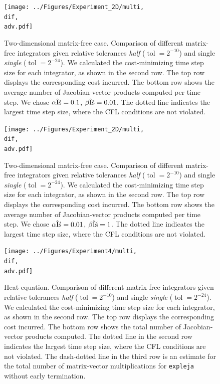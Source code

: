 \documentclass{scrartcl}
\begin{document}
\begin{figure}[t]
	\newcommand{\dif}{\detokenize{α}=0.1}
	\newcommand{\adv}{\detokenize{β}=0.01}
	\centering
	\texttt{[image: ../Figures/Experiment\_2D/multi, \\dif, \\adv.pdf]}
	\caption{Two-dimensional matrix-free case. Comparison of different matrix-free integrators given relative tolerances \textit{half} ($\operatorname{tol} = 2^{-10}$) and single \textit{single} ($\operatorname{tol} = 2^{-24}$). We calculated the cost-minimizing time step size for each integrator, as shown in the second row. The top row displays the corresponding cost incurred. The bottom row shows the average number of Jacobian-vector products computed per time step. We chose $\alpha\dif$, $\beta\adv$. The dotted line indicates the largest time step size, where the CFL conditions are not violated.}
	\label{fig:2DNonlinearHighPe}
\end{figure}

\begin{figure}[t]
	\newcommand{\dif}{\detokenize{α}=0.01}
	\newcommand{\adv}{\detokenize{β}=1}
	\centering
	\texttt{[image: ../Figures/Experiment\_2D/multi, \\dif, \\adv.pdf]}
	\caption{Two-dimensional matrix-free case. Comparison of different matrix-free integrators given relative tolerances \textit{half} ($\operatorname{tol} = 2^{-10}$) and single \textit{single} ($\operatorname{tol} = 2^{-24}$). We calculated the cost-minimizing time step size for each integrator, as shown in the second row. The top row displays the corresponding cost incurred. The bottom row shows the average number of Jacobian-vector products computed per time step. We chose $\alpha\dif$, $\beta\adv$. The dotted line indicates the largest time step size, where the CFL conditions are not violated.}
	\label{fig:2DNonlinearLowPe}
\end{figure}

\begin{figure}[t]
	\newcommand{\dif}{\detokenize{α}=1}
	\newcommand{\adv}{\detokenize{β}=0}
	\centering
	\texttt{[image: ../Figures/Experiment4/multi, \\dif, \\adv.pdf]}
	\caption{Heat equation. Comparison of different matrix-free integrators given relative tolerances \textit{half} ($\operatorname{tol} = 2^{-10}$) and single \textit{single} ($\operatorname{tol} = 2^{-24}$). We calculated the cost-minimizing time step size for each integrator, as shown in the second row. The top row displays the corresponding cost incurred. The bottom row shows the total number of Jacobian-vector products computed. The dotted line in the second row indicates the largest time step size, where the CFL conditions are not violated. The dash-dotted line in the third row is an estimate for the total number of matrix-vector multiplications for \texttt{expleja} without early termination.}
	\label{fig:heat}
\end{figure}
\end{document}
